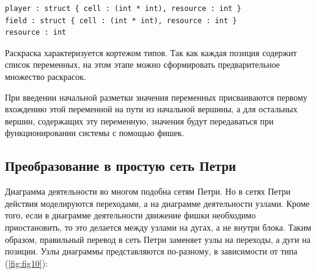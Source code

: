 \begin{verbatim}
player : struct { cell : (int * int), resource : int }
field : struct { cell : (int * int), resource : int }
resource : int
\end{verbatim}

Раскраска характеризуется кортежом типов. Так как каждая позиция содержит список переменных, на этом этапе можно сформировать предварительное множество раскрасок.

При введении начальной разметки значения переменных присваиваются первому вхождению этой переменной на пути из начальной вершины, а для остальных вершин, содержащих эту переменную, значения будут передаваться при функционировании системы с помощью фишек.

\subsection{Преобразование в простую сеть Петри}

Диаграмма деятельности во многом подобна сетям Петри. Но в сетях Петри действия моделируются переходами, а на диаграмме деятельности узлами. Кроме того, если в диаграмме деятельности движение фишки необходимо приостановить, то это делается между узлами на дугах, а не внутри блока. Таким образом, правильный перевод в сеть Петри заменяет узлы на переходы, а дуги на позиции. Узлы диаграммы представляются по-разному, в зависимости от типа (\ref{fig:fig10}):

